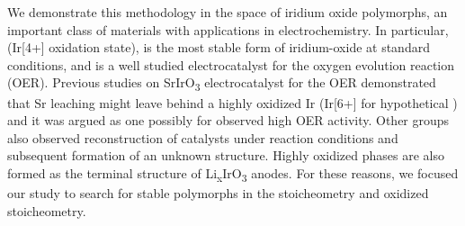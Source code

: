 We demonstrate this methodology in the space of iridium oxide polymorphs,
an important class of materials with applications in electrochemistry.
%
In particular, \rIrOtwo (Ir[4+] oxidation state), is the most stable form of iridium-oxide at standard conditions,
and is a well studied electrocatalyst for the oxygen evolution reaction (OER).
\cite{Seitz2016,Lee2012a,McCrory2015,Trotochaud2012,Danilovic2014,Carmo2013,Miles1978,Beni1979}
%
Previous studies on SrIrO\textsubscript{3} electrocatalyst for the OER demonstrated that Sr leaching might leave behind a highly oxidized Ir (Ir[6+] for hypothetical \IrOthree) and it was argued as one possibly for observed high OER activity.\cite{Seitz2016}
%
Other groups also observed reconstruction of \IrOx catalysts under reaction conditions and subsequent formation of an unknown structure. \cite{Pearce2017} 
%
Highly oxidized \IrOthree phases are also formed as the terminal structure of Li\textsubscript{x}IrO\textsubscript{3} anodes.\cite{Pearce2017}
%
For these reasons, we focused our study to search for stable polymorphs in the \IrOtwo stoicheometry and  oxidized \IrOthree stoicheometry.
%
%



